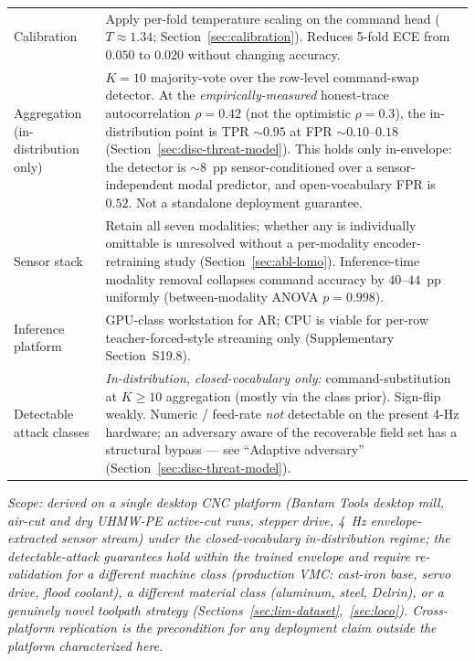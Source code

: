 \documentclass[11pt,a4paper]{article}
\begin{document}
\begin{center}
\begin{tabular}{p{} p{}}
Calibration & Apply per-fold temperature scaling on the command head ($T \approx 1.34$; Section~\ref{sec:calibration}). Reduces 5-fold ECE from $0.050$ to $0.020$ without changing accuracy. \\
Aggregation (in-distribution only) & $K=10$ majority-vote over the row-level command-swap detector. At the \emph{empirically-measured} honest-trace autocorrelation $\rho=0.42$ (not the optimistic $\rho=0.3$), the in-distribution point is TPR $\sim 0.95$ at FPR $\sim 0.10$--$0.18$ (Section~\ref{sec:disc-threat-model}). This holds only in-envelope: the detector is $\sim$8~pp sensor-conditioned over a sensor-independent modal predictor, and open-vocabulary FPR is $0.52$. Not a standalone deployment guarantee. \\
Sensor stack & Retain all seven modalities; whether any is individually omittable is unresolved without a per-modality encoder-retraining study (Section~\ref{sec:abl-lomo}). Inference-time modality removal collapses command accuracy by $40$--$44$~pp uniformly (between-modality ANOVA $p=0.998$). \\
Inference platform & GPU-class workstation for AR; CPU is viable for per-row teacher-forced-style streaming only (Supplementary Section~S19.8). \\
Detectable attack classes & \emph{In-distribution, closed-vocabulary only:} command-substitution at $K \ge 10$ aggregation (mostly via the class prior). Sign-flip weakly. Numeric / feed-rate \emph{not} detectable on the present 4-Hz hardware; an adversary aware of the recoverable field set has a structural bypass --- see ``Adaptive adversary'' (Section~\ref{sec:disc-threat-model}). \\
\bottomrule
\end{tabular}
\end{center}
\noindent\footnotesize\textit{Scope: derived on a single desktop CNC platform (Bantam Tools desktop mill, air-cut and dry UHMW-PE active-cut runs, stepper drive, 4~Hz envelope-extracted sensor stream) under the closed-vocabulary in-distribution regime; the detectable-attack guarantees hold within the trained envelope and require re-validation for a different machine class (production VMC: cast-iron base, servo drive, flood coolant), a different material class (aluminum, steel, Delrin), or a genuinely novel toolpath strategy (Sections~\ref{sec:lim-dataset},~\ref{sec:loco}). Cross-platform replication is the precondition for any deployment claim outside the platform characterized here.}\normalsize
\end{document}
